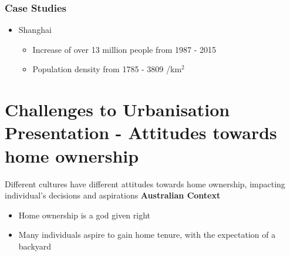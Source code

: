 		\subsubsection{Case Studies}
			\begin{itemize}
				\item Shanghai
				\begin{itemize}
					\item Increase of over 13 million people from 1987 - 2015
					\item Population density from 1785 - 3809 /km$^2$
				\end{itemize}
			\end{itemize}

\section{Challenges to Urbanisation Presentation - Attitudes towards home ownership} \label{18/02/2025}
	Different cultures have different attitudes towards home ownership, impacting individual's decisions and aspirations
	\textbf{Australian Context}
	\begin{itemize}
		\item Home ownership is a god given right
		\item Many individuals aspire to gain home tenure, with the expectation of a backyard
	\end{itemize}
